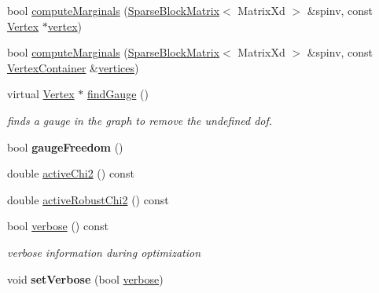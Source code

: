 \begin{DoxyCompactItemize}
\item 
bool \hyperlink{classg2o_1_1SparseOptimizer_ad9f7ba03f7f37114f757f34f67dd48e5}{compute\-Marginals} (\hyperlink{classg2o_1_1SparseBlockMatrix}{Sparse\-Block\-Matrix}$<$ Matrix\-Xd $>$ \&spinv, const \hyperlink{classg2o_1_1HyperGraph_1_1Vertex}{Vertex} $\ast$\hyperlink{structg2o_1_1OptimizableGraph_a19e014e8ec2e9a6e894da8c3a8f8e50d}{vertex})
\item 
bool \hyperlink{classg2o_1_1SparseOptimizer_a06bd3e9f1576dafeae317d2697c6f532}{compute\-Marginals} (\hyperlink{classg2o_1_1SparseBlockMatrix}{Sparse\-Block\-Matrix}$<$ Matrix\-Xd $>$ \&spinv, const \hyperlink{structg2o_1_1OptimizableGraph_a54f01b9b6071e65e6abeebe4afb29dec}{Vertex\-Container} \&\hyperlink{classg2o_1_1HyperGraph_a3e713e7ee84eecad3876651737af6cfc}{vertices})
\item 
\hypertarget{classg2o_1_1SparseOptimizer_aad77b73bf7d192fcebf1daf9ae103036}{virtual \hyperlink{classg2o_1_1HyperGraph_1_1Vertex}{Vertex} $\ast$ \hyperlink{classg2o_1_1SparseOptimizer_aad77b73bf7d192fcebf1daf9ae103036}{find\-Gauge} ()}\label{classg2o_1_1SparseOptimizer_aad77b73bf7d192fcebf1daf9ae103036}

\begin{DoxyCompactList}\small\item\em finds a gauge in the graph to remove the undefined dof. \end{DoxyCompactList}\item 
\hypertarget{classg2o_1_1SparseOptimizer_ac99e785f4822dd540b389ea179ce4f06}{bool {\bfseries gauge\-Freedom} ()}\label{classg2o_1_1SparseOptimizer_ac99e785f4822dd540b389ea179ce4f06}

\item 
double \hyperlink{classg2o_1_1SparseOptimizer_add4d83073e22dbb48b66b953d0185ffa}{active\-Chi2} () const 
\item 
double \hyperlink{classg2o_1_1SparseOptimizer_ae47c5023e53685523499fc00d6057d14}{active\-Robust\-Chi2} () const 
\item 
\hypertarget{classg2o_1_1SparseOptimizer_a99851ba4f2a507e724de43d7fe92f903}{bool \hyperlink{classg2o_1_1SparseOptimizer_a99851ba4f2a507e724de43d7fe92f903}{verbose} () const }\label{classg2o_1_1SparseOptimizer_a99851ba4f2a507e724de43d7fe92f903}

\begin{DoxyCompactList}\small\item\em verbose information during optimization \end{DoxyCompactList}\item 
\hypertarget{classg2o_1_1SparseOptimizer_a422f4c5c78a0c475f4998e24ee173cc7}{void {\bfseries set\-Verbose} (bool \hyperlink{classg2o_1_1SparseOptimizer_a99851ba4f2a507e724de43d7fe92f903}{verbose})}\label{classg2o_1_1SparseOptimizer_a422f4c5c78a0c475f4998e24ee173cc7}


\end{DoxyCompactItemize}
